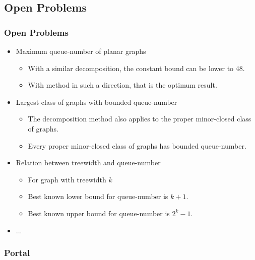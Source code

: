 \documentclass{beamer}
\begin{document}
	\subsection{Open Problems}
	\begin{frame}
		\frametitle{Open Problems}
		\begin{itemize}
			\item Maximum queue-number of planar graphs
			\begin{itemize}
				\item With a similar decomposition, the constant bound can be lower to 48.
				\item With method in such a direction, that is the optimum result.
			\end{itemize}
			\item Largest class of graphs with bounded queue-number
			\begin{itemize}
				\item The decomposition method also applies to the proper minor-closed class of graphs.
				\item Every proper minor-closed class of graphs has bounded queue-number.
			\end{itemize}
			\item Relation between treewidth and queue-number
			\begin{itemize}
				\item For graph with treewidth $k$
				\item Best known lower bound for queue-number is $k+1$.
				\item Best known upper bound for queue-number is $2^k - 1$.
			\end{itemize}
			\item ...
		\end{itemize}
	\end{frame}
	
	\begin{frame}
		\frametitle{Portal}
		\tableofcontents
	\end{frame}
	
\end{document}
